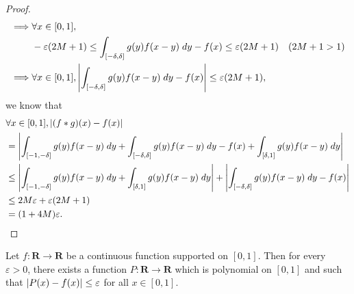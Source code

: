 \begin{proof}
\begin{align*}
        \implies & \forall x \in [0, 1],                                                                                                                                               \\
                 & -\varepsilon (2M + 1) \leq \int_{[-\delta, \delta]} g(y) f(x - y) \; dy - f(x) \leq \varepsilon (2M + 1)                      & (2M + 1 > 1)                        \\
        \implies & \forall x \in [0, 1], \abs*{\int_{[-\delta, \delta]} g(y) f(x - y) \; dy - f(x)} \leq \varepsilon (2M + 1),
    \end{align*}
    we know that
    \begin{align*}
         & \forall x \in [0, 1], \abs*{(f * g)(x) - f(x)}                                                                                                             \\
         & = \abs*{\int_{[-1, -\delta]} g(y) f(x - y) \; dy + \int_{[-\delta, \delta]} g(y) f(x - y) \; dy - f(x) + \int_{[\delta, 1]} g(y) f(x - y) \; dy}           \\
         & \leq \abs*{\int_{[-1, -\delta]} g(y) f(x - y) \; dy + \int_{[\delta, 1]} g(y) f(x - y) \; dy} + \abs*{\int_{[-\delta, \delta]} g(y) f(x - y) \; dy - f(x)} \\
         & \leq 2 M \varepsilon + \varepsilon (2M + 1)                                                                                                                \\
         & = (1 + 4M) \varepsilon.
    \end{align*}
\end{proof}

\begin{corollary}\label{3.8.15}
    Let \(f : \mathbf{R} \to \mathbf{R}\) be a continuous function supported on \([0, 1]\).
    Then for every \(\varepsilon > 0\), there exists a function \(P : \mathbf{R} \to \mathbf{R}\) which is polynomial on \([0, 1]\) and such that \(\abs*{P(x) - f(x)} \leq \varepsilon\) for all \(x \in [0, 1]\).
\end{corollary}

